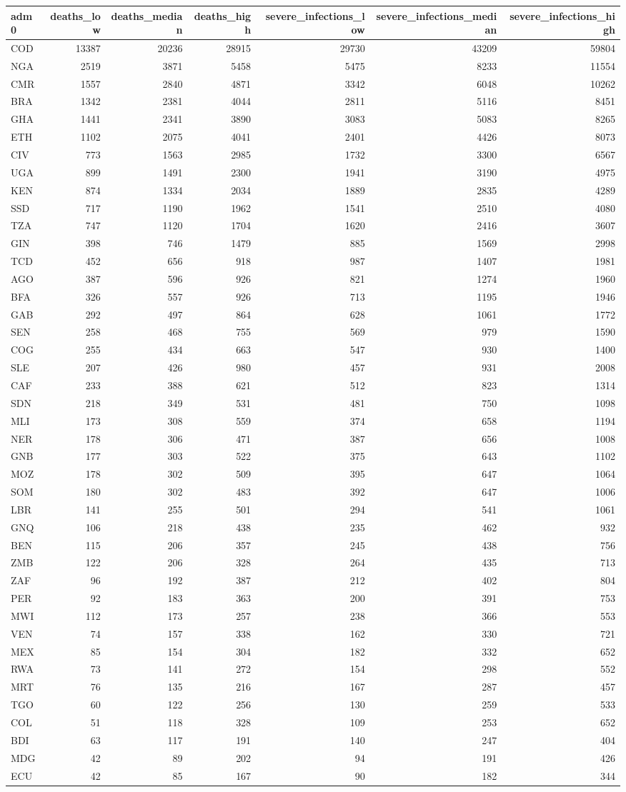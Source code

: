 \documentclass[
]{article}
\begin{document}
\begin{longtable}[]{@{}lrrrrrr@{}}
\toprule
adm0 & deaths\_low & deaths\_median & deaths\_high &
severe\_infections\_low & severe\_infections\_median &
severe\_infections\_high\tabularnewline
\midrule
\endhead
COD & 13387 & 20236 & 28915 & 29730 & 43209 & 59804\tabularnewline
NGA & 2519 & 3871 & 5458 & 5475 & 8233 & 11554\tabularnewline
CMR & 1557 & 2840 & 4871 & 3342 & 6048 & 10262\tabularnewline
BRA & 1342 & 2381 & 4044 & 2811 & 5116 & 8451\tabularnewline
GHA & 1441 & 2341 & 3890 & 3083 & 5083 & 8265\tabularnewline
ETH & 1102 & 2075 & 4041 & 2401 & 4426 & 8073\tabularnewline
CIV & 773 & 1563 & 2985 & 1732 & 3300 & 6567\tabularnewline
UGA & 899 & 1491 & 2300 & 1941 & 3190 & 4975\tabularnewline
KEN & 874 & 1334 & 2034 & 1889 & 2835 & 4289\tabularnewline
SSD & 717 & 1190 & 1962 & 1541 & 2510 & 4080\tabularnewline
TZA & 747 & 1120 & 1704 & 1620 & 2416 & 3607\tabularnewline
GIN & 398 & 746 & 1479 & 885 & 1569 & 2998\tabularnewline
TCD & 452 & 656 & 918 & 987 & 1407 & 1981\tabularnewline
AGO & 387 & 596 & 926 & 821 & 1274 & 1960\tabularnewline
BFA & 326 & 557 & 926 & 713 & 1195 & 1946\tabularnewline
GAB & 292 & 497 & 864 & 628 & 1061 & 1772\tabularnewline
SEN & 258 & 468 & 755 & 569 & 979 & 1590\tabularnewline
COG & 255 & 434 & 663 & 547 & 930 & 1400\tabularnewline
SLE & 207 & 426 & 980 & 457 & 931 & 2008\tabularnewline
CAF & 233 & 388 & 621 & 512 & 823 & 1314\tabularnewline
SDN & 218 & 349 & 531 & 481 & 750 & 1098\tabularnewline
MLI & 173 & 308 & 559 & 374 & 658 & 1194\tabularnewline
NER & 178 & 306 & 471 & 387 & 656 & 1008\tabularnewline
GNB & 177 & 303 & 522 & 375 & 643 & 1102\tabularnewline
MOZ & 178 & 302 & 509 & 395 & 647 & 1064\tabularnewline
SOM & 180 & 302 & 483 & 392 & 647 & 1006\tabularnewline
LBR & 141 & 255 & 501 & 294 & 541 & 1061\tabularnewline
GNQ & 106 & 218 & 438 & 235 & 462 & 932\tabularnewline
BEN & 115 & 206 & 357 & 245 & 438 & 756\tabularnewline
ZMB & 122 & 206 & 328 & 264 & 435 & 713\tabularnewline
ZAF & 96 & 192 & 387 & 212 & 402 & 804\tabularnewline
PER & 92 & 183 & 363 & 200 & 391 & 753\tabularnewline
MWI & 112 & 173 & 257 & 238 & 366 & 553\tabularnewline
VEN & 74 & 157 & 338 & 162 & 330 & 721\tabularnewline
MEX & 85 & 154 & 304 & 182 & 332 & 652\tabularnewline
RWA & 73 & 141 & 272 & 154 & 298 & 552\tabularnewline
MRT & 76 & 135 & 216 & 167 & 287 & 457\tabularnewline
TGO & 60 & 122 & 256 & 130 & 259 & 533\tabularnewline
COL & 51 & 118 & 328 & 109 & 253 & 652\tabularnewline
BDI & 63 & 117 & 191 & 140 & 247 & 404\tabularnewline
MDG & 42 & 89 & 202 & 94 & 191 & 426\tabularnewline
ECU & 42 & 85 & 167 & 90 & 182 & 344\tabularnewline

\end{longtable}
\end{document}
